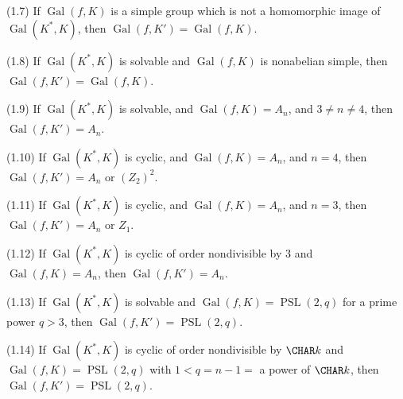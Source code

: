 {\rm(1.7)} If $\operatorname{Gal}(f,K)$ is a simple group 
which is not a 
homomorphic image of $\operatorname{Gal}(K^*,K)$, then
$\operatorname{Gal}(f,K')=\operatorname{Gal}(f,K)$.

{\rm(1.8)} If $\operatorname{Gal}(K^*,K)$ is solvable and 
$\operatorname{Gal}(f,K)$ is  
nonabelian simple, then %
$\operatorname{Gal}(f,K')=\operatorname{Gal}(f,K)$.

{\rm(1.9)} If $\operatorname{Gal}(K^*,K)$ is solvable, and 
$\operatorname{Gal}(f,K)=A_n$, and 
$3\ne n\ne 4$, then %
$\operatorname{Gal}(f,K')=A_n$.

{\rm(1.10)} If $\operatorname{Gal}(K^*,K)$ is cyclic, and
$\operatorname{Gal}(f,K)=A_n$, and $n=4$, then %
$\operatorname{Gal}(f,K')=A_n\text{ or }(Z_2)^2$.

{\rm(1.11)} If $\operatorname{Gal}(K^*,K)$ is cyclic, and 
$\operatorname{Gal}(f,K)=A_n$, and $n=3$, then %
$\operatorname{Gal}(f,K')=A_n\text{ or }Z_1$.

{\rm(1.12)} If $\operatorname{Gal}(K^*,K)$ is cyclic of 
order 
nondivisible by $3$ and 
$\operatorname{Gal}(f,K)=A_n$, then 
$\operatorname{Gal}(f,K')=A_n$.

{\rm(1.13)} If $\operatorname{Gal}(K^*,K)$ is solvable and 
$\operatorname{Gal}(f,K)=\operatorname{PSL}(2,q)$ for a 
prime power $q>3$, 
then $\operatorname{Gal}(f,K')=\operatorname{PSL}(2,q)$.

{\rm(1.14)} If $\operatorname{Gal}(K^*,K)$ is cyclic of 
order 
nondivisible by
$\CHAR k$ and 
$\operatorname{Gal}(f,K)
=\operatorname{PSL}(2,q)$ with $1<q=n-1=$ a power of
$\CHAR k$, then 
$\operatorname{Gal}(f,K')=\operatorname{PSL}(2,q)$.
\endproclaim

